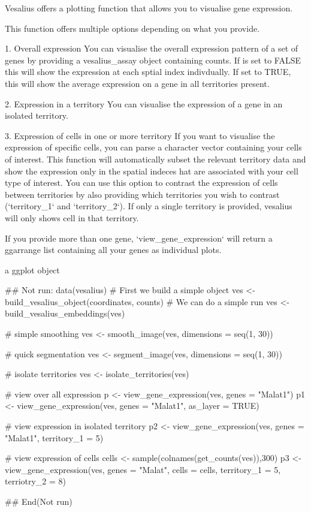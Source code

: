 \documentclass[a4paper]{book}
\begin{document}
\begin{Details}
Vesalius offers a plotting function that allows you to 
visualise gene expression. 

This function offers multiple options depending on what you provide.

1. Overall expression
You can visualise the overall expression pattern of a set of genes
by providing a vesalius\_assay object containing counts.
If  is set to FALSE this will show the expression at
each sptial index indivdually. If set to TRUE, this will show the
average expression on a gene in all territories present.

2. Expression in a territory
You can visualise the expression of a gene in an isolated territory.

3. Expression of cells in one or more territory
If you want to visualise the expression of specific cells, you can
parse a character vector containing your cells of interest. This
function will automatically subset the relevant territory data and
show the expression only in the spatial indeces hat are associated
with your cell type of interest. You can use this option to contrast
the expression of cells between territories by also providing which
territories you wish to contrast (`territory\_1` and `territory\_2`).
If only a single territory is provided, vesalius will only shows cell
in that territory.

If you provide more than one gene, `view\_gene\_expression` will return 
a ggarrange list containing all your genes as individual plots.
\end{Details}
%
\begin{Value}
a ggplot object
\end{Value}
%
\begin{Examples}
\begin{ExampleCode}
## Not run: 
data(vesalius)
# First we build a simple object
ves <- build_vesalius_object(coordinates, counts)
# We can do a simple run
ves <- build_vesalius_embeddings(ves)

# simple smoothing
ves <- smooth_image(ves, dimensions = seq(1, 30))

# quick segmentation
ves <- segment_image(ves, dimensions = seq(1, 30))

# isolate territories
ves <- isolate_territories(ves)

# view over all expression
p <- view_gene_expression(ves, genes = "Malat1")
p1 <- view_gene_expression(ves, genes = "Malat1", as_layer = TRUE)

# view expression in isolated territory 
p2 <- view_gene_expression(ves, genes = "Malat1", territory_1 = 5)

# view expression of cells
cells <- sample(colnames(get_counts(ves)),300)
p3 <- view_gene_expression(ves,
 genes = "Malat",
 cells = cells,
 territory_1 = 5,
 terriotry_2 = 8)

## End(Not run)
\end{ExampleCode}
\end{Examples}
\printindex{}
\end{document}

